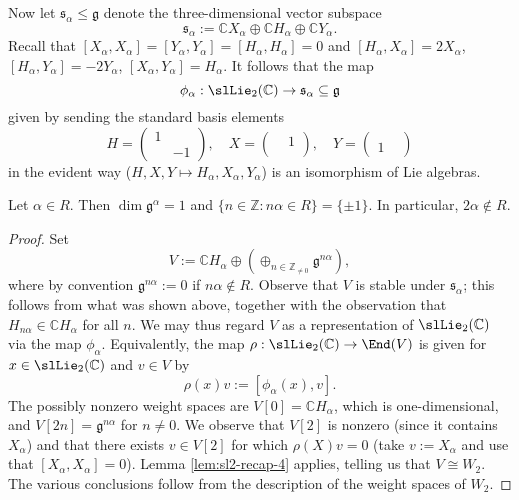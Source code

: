 \documentclass[reqno]{amsart} 
\begin{document}
Now let $\mathfrak{s}_\alpha \leq \mathfrak{g}$ denote the three-dimensional vector subspace
\begin{equation*}
  \mathfrak{s}_\alpha := \mathbb{C} X_\alpha \oplus \mathbb{C} H_\alpha \oplus \mathbb{C} Y_\alpha.
\end{equation*}
Recall that $[X_\alpha,X_\alpha] = [Y_\alpha,Y_\alpha] = [H_\alpha,H_\alpha] = 0$ and $[H_\alpha,X_\alpha] = 2 X_\alpha$, $[H_\alpha,Y_\alpha] = -2 Y_\alpha$, $[X_\alpha,Y_\alpha] = H_\alpha$.  It follows that the map
\begin{equation*}
  \phi_\alpha : \slLie_2(\mathbb{C}) \rightarrow \mathfrak{s}_\alpha \subseteq \mathfrak{g}
\end{equation*}
given by sending the standard basis elements
\begin{equation*}
  H = 
\begin{pmatrix}
    1 &  \\
      & -1
  \end{pmatrix}
  ,
  \quad
  X = 
\begin{pmatrix}
    & 1 \\
    & 
  \end{pmatrix}
  ,
  \quad
  Y = 
\begin{pmatrix}
    &  \\
    1 & 
  \end{pmatrix}
\end{equation*}
in the evident way ($H,X,Y \mapsto H_\alpha,X_\alpha,Y_\alpha$) is an isomorphism of Lie algebras.

\begin{lemma}\label{lem:root-spaces-one-dimensional}
  Let $\alpha \in R$.  Then $\dim \mathfrak{g}^\alpha = 1$ and $\{n \in \mathbb{Z} : n \alpha \in R \} = \{\pm 1 \}$.  In particular, $2 \alpha \notin R$.
\end{lemma}
\begin{proof}
  Set
  \begin{equation*}
    V := \mathbb{C} H_\alpha \oplus (\oplus_{n \in \mathbb{Z}_{\neq 0}} \mathfrak{g}^{n \alpha}),
  \end{equation*}
  where by convention $\mathfrak{g}^{n \alpha} := 0$ if $n \alpha \notin R$.  Observe that $V$ is stable under $\mathfrak{s}_\alpha$; this follows from what was shown above, together with the observation that $H_{n \alpha} \in \mathbb{C} H_\alpha$ for all $n$.  We may thus regard $V$ as a representation of $\slLie_2(\mathbb{C})$ via the map $\phi_\alpha$.  Equivalently, the map $\rho : \slLie_2(\mathbb{C}) \rightarrow \End(V)$ is given for $x \in \slLie_2(\mathbb{C})$ and $v \in V$ by
  \begin{equation*}
    \rho(x) v := [\phi_\alpha(x),v].
  \end{equation*}
  The possibly nonzero weight spaces are $V[0] = \mathbb{C} H_\alpha$, which is one-dimensional, and $V[2 n] = \mathfrak{g}^{n \alpha}$ for $n \neq 0$.  We observe that $V[2]$ is nonzero (since it contains $X_\alpha$) and that there exists $v \in V[2]$ for which $\rho(X) v = 0$ (take $v := X_\alpha$ and use that $[X_\alpha,X_\alpha] = 0$).  Lemma \ref{lem:sl2-recap-4} applies, telling us that $V \cong W_2$.  The various conclusions follow from the description of the weight spaces of $W_2$.
\end{proof}
\end{document}
